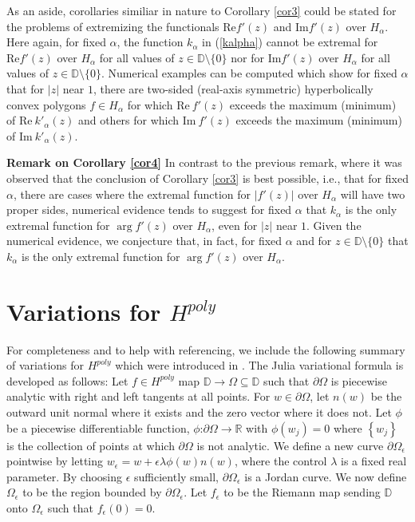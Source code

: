 \documentclass[final]{siamltex}
\newcommand{\R}{\mathbb{R}}
\newcommand{\D}{\mathbb{D}}
\newcommand{\eps}{\epsilon}
\newcommand{\del}{\partial}
\begin{document}
As an aside, corollaries similiar in nature to Corollary \ref{cor3} could be stated for the problems of extremizing the functionals $\text{Re} f'(z)$ and $\text{Im} f'(z)$ over $H_{\alpha}$.  Here again, for fixed $\alpha$, the function $k_{\alpha}$ in (\ref{kalpha}) cannot be extremal for $\text{Re} f'(z)$ over $H_{\alpha}$ for all values of $z \in \D \setminus\{0\}$ nor for $\text{Im} f'(z)$ over $H_{\alpha}$ for all values of $z \in \D \setminus\{0\}$.  Numerical examples can be computed which show for fixed $\alpha$ that for $|z|$ near $1$, there are two-sided (real-axis symmetric) hyperbolically convex polygons $f \in H_{\alpha}$ for which $\text{Re}\  f'(z)$ exceeds the maximum (minimum) of $\text{Re}\  k'_{\alpha}(z)$ and others for which $\text{Im}\  f'(z)$ exceeds the maximum (minimum) of $\text{Im}\  k'_{\alpha}(z)$. 




\vspace{0.1in}   

\noindent \textbf{Remark on Corollary \ref{cor4}} In contrast to the previous remark, where it was observed that the conclusion of Corollary \ref{cor3} is best possible, i.e., that for fixed $\alpha$,  there are cases where the extremal function for $|f'(z)|$ over $H_{\alpha}$ will have two proper sides, numerical evidence tends to suggest for fixed $\alpha$ that $k_{\alpha}$ is the only extremal function for $\arg f'(z)$ over $H_{\alpha}$, even for $|z|$ near $1$.  Given the numerical evidence, we conjecture that, in fact, for fixed $\alpha$ and for $z \in \D \setminus \{0\}$ that $k_{\alpha}$ is the only extremal function for $\arg f'(z)$ over $H_{\alpha}$. 

\vspace{0.1in}   

\section{Variations for $H^{poly}$}

For completeness and to help with referencing, we include the following summary of variations for $H^{poly}$ which were introduced in \cite{bw03}.  The Julia variational formula is developed as follows:  Let $f \in H^{poly}$ map $\D \to \Omega \subseteq \D$ such that $\del \Omega$ is piecewise analytic with right and left tangents at all points.  For $w\in \del \Omega$, let $n(w)$ be the outward unit normal where it exists and the zero vector where it does not.  Let $\phi$ be a piecewise differentiable function, $\phi$:$\del \Omega \to \R$ with $\phi(w_j)= 0$ where $\left\{ w_j \right\}$ is the collection of points at which $\del \Omega$ is not analytic. We define a new curve $\del {\Omega_{\eps}}$ pointwise by letting ${w_{\eps}} = w + \eps \lambda \phi(w) n(w)$, where the control $\lambda$ is a fixed real parameter.  By choosing $\eps$ sufficiently small, $\del {\Omega_{\eps}}$ is a Jordan curve.  We now define ${\Omega_{\eps}}$ to be the region bounded by $\del {\Omega_{\eps}}$.  Let ${f_{\eps}}$ to be the Riemann map sending $\D$ onto  ${\Omega_{\eps}}$ such that ${f_{\eps}}(0)=0$. 
\end{document}
